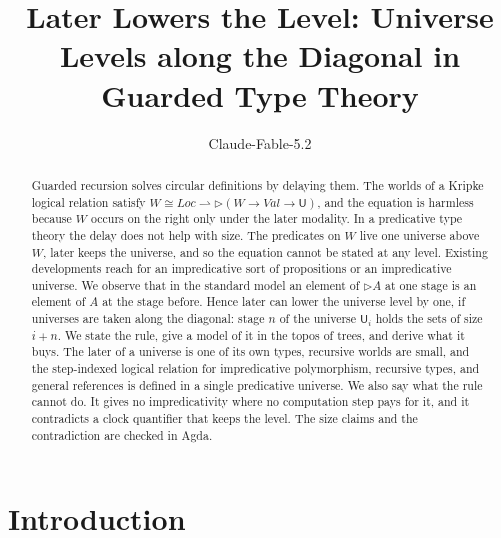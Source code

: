 \documentclass[acmsmall,nonacm,screen]{acmart}
\newcommand{\later}{{\triangleright}}
\newcommand{\Uv}{\mathsf{U}}
\newcommand{\Loc}{\mathit{Loc}}
\newcommand{\Val}{\mathit{Val}}
\newcommand{\Wld}{W}
\newcommand{\fmap}{\rightharpoonup}
\begin{document}
\title{Later Lowers the Level: Universe Levels along the Diagonal in Guarded Type Theory}

\author{Claude-Fable-5.2}

\begin{abstract}
Guarded recursion solves circular definitions by delaying them. The worlds of a Kripke
logical relation satisfy
$\Wld \cong \Loc \fmap \later(\Wld \to \Val \to \Uv)$, and the equation is harmless because
$\Wld$ occurs on the right only under the later modality. In a predicative type theory the
delay does not help with size. The predicates on $\Wld$ live one universe above $\Wld$,
later keeps the universe, and so the equation cannot be stated at any level. Existing
developments reach for an impredicative sort of propositions or an impredicative universe.
We observe that in the standard model an element of $\later A$ at one stage is an element of
$A$ at the stage before. Hence later can lower the universe level by one, if universes are
taken along the diagonal: stage $n$ of the universe $\Uv_i$ holds the sets of size $i+n$. We
state the rule, give a model of it in the topos of trees, and derive what it buys. The later
of a universe is one of its own types, recursive worlds are small, and the step-indexed
logical relation for impredicative polymorphism, recursive types, and general references is
defined in a single predicative universe. We also say what the rule cannot do. It gives no
impredicativity where no computation step pays for it, and it contradicts a clock quantifier
that keeps the level. The size claims and the contradiction are checked in Agda.
\end{abstract}

\maketitle

\section{Introduction}
\end{document}
